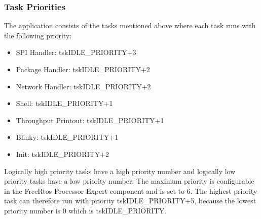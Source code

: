 \subsubsection{Task Priorities} \label{subsec:txtTaskPriorities}
The application consists of the tasks mentioned above where each task runs with the following priority:
\begin{itemize}
    \item SPI Handler:			\tab tskIDLE\_PRIORITY+3
    \item Package Handler:		\tab tskIDLE\_PRIORITY+2
    \item Network Handler:		\tab tskIDLE\_PRIORITY+2
    \item Shell:				\tab tskIDLE\_PRIORITY+1
    \item Throughput Printout:	\tab tskIDLE\_PRIORITY+1
    \item Blinky:				\tab tskIDLE\_PRIORITY+1
    \item Init:					\tab tskIDLE\_PRIORITY+2
\end{itemize}
Logically high priority tasks have a high priority number and logically low priority tasks have a low priority number. The maximum priority is configurable in the FreeRtos Processor Expert component and is set to 6. The highest priority task can therefore run with priority tskIDLE\_PRIORITY+5, because the lowest priority number is 0 which is tskIDLE\_PRIORITY.
%
